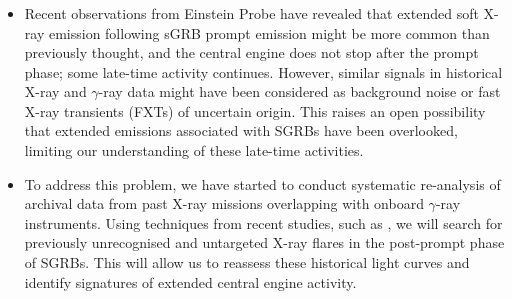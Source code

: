 \subsubsection*{\fontsize{11.5 pt}{10 pt}\selectfont{X-ray Transients and Archival Flares :}}
\begin{itemize}
    \itemsep0em 
    \item Recent observations from Einstein Probe have revealed that extended soft X-ray emission following sGRB prompt emission might be more common than previously thought, and the central engine does not stop after the prompt phase; some late-time activity continues. However, similar signals in historical X-ray and $\gamma$-ray data might have been considered as background noise or fast X-ray transients (FXTs) of uncertain origin. This raises an open possibility that extended emissions associated with SGRBs have been overlooked, limiting our understanding of these late-time activities. 
    \item To address this problem, we have started to conduct systematic re-analysis of archival data from past X-ray missions overlapping with onboard $\gamma$-ray instruments. Using techniques from recent studies, such as \cite{zand2025bepposaxwfccatalogfastxray}, we will search for previously unrecognised and untargeted X-ray flares in the post-prompt phase of SGRBs. This will allow us to reassess these historical light curves and identify signatures of extended central engine activity.
\end{itemize}

\subsubsection*{\fontsize{11.5 pt}{10 pt}\selectfont{Early Optical Afterglows : 
}}

